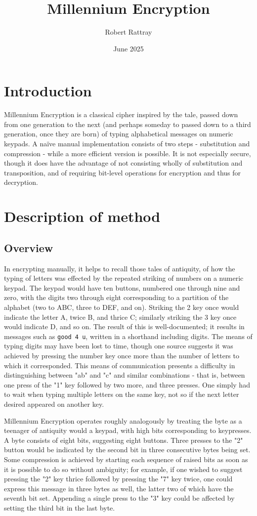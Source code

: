 \documentclass{article}
\title{Millennium Encryption}
\author{Robert Rattray}
\date{June 2025}
\begin{document}
\maketitle

\section{Introduction}
Millennium Encryption is a classical cipher inspired by the tale, passed down from one generation to the next (and perhaps someday to passed down to a third generation, once they are born) of typing alphabetical messages on numeric keypads.  A naïve manual implementation consists of two steps - substitution and compression - while a more efficient version is possible.  It is not especially secure, though it does have the advantage of not consisting wholly of substitution and transposition, and of requiring bit-level operations for encryption and thus for decryption.

\section{Description of method}
\subsection{Overview}
In encrypting manually, it helps to recall those tales of antiquity, of how the typing of letters was effected by the repeated striking of numbers on a numeric keypad.  The keypad would have ten buttons, numbered one through nine and zero, with the digits two through eight corresponding to a partition of the alphabet (two to ABC, three to DEF, and on).  Striking the 2 key once would indicate the letter A, twice B, and thrice C; similarly striking the 3 key once would indicate D, and so on.  The result of this is well-documented; it results in messages such as \verb|good 4 u|, written in a shorthand including digits.  The means of typing digits may have been lost to time, though one source suggests it was achieved by pressing the number key once more than the number of letters to which it corresponded.  This means of communication presents a difficulty in distinguishing between "ab" and "c" and similar combinations - that is, between one press of the "1" key followed by two more, and three presses.  One simply had to wait when typing multiple letters on the same key, not so if the next letter desired appeared on another key.

Millennium Encryption operates roughly analogously by treating the byte as a teenager of antiquity would a keypad, with high bits corresponding to keypresses.  A byte consists of eight bits, suggesting eight buttons. Three presses to the "2" button would be indicated by the second bit in three consecutive bytes being set.  Some compression is achieved by starting each sequence of raised bits as soon as it is possible to do so without ambiguity; for example, if one wished to suggest pressing the "2" key thrice followed by pressing the "7" key twice, one could express this message in three bytes as well, the latter two of which have the seventh bit set.  Appending a single press to the "3" key could be affected by setting the third bit in the last byte.
\end{document}
